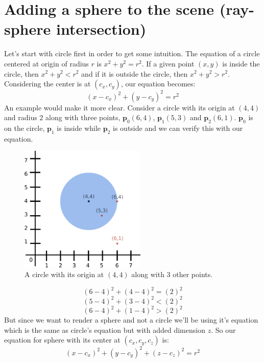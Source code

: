 \documentclass[11pt,a4paper]{article}
\begin{document}
	\section{Adding a sphere to the scene (ray-sphere intersection)}
	Let's start with circle first in order to get some intuition. The equation of a circle centered at origin of radius $r$ is $x^2+y^2=r^2$. If a given point $(x, y)$ is inside the circle, then $x^2+y^2<r^2$ and if it is outside the circle, then $x^2+y^2>r^2$. Considering the center is at $(c_{x}, c_{y})$, our equation becomes:
	\begin{equation}
	(x-c_{x})^2+(y-c_{y})^2=r^2
	\end{equation}
	An example would make it more clear. Consider a circle with its origin at $(4, 4)$ and radius $2$ along with three points, $\boldsymbol{p}_{0}(6, 4)$, $\boldsymbol{p}_{1}(5, 3)$ and $\boldsymbol{p}_{2}(6, 1)$. $\boldsymbol{p}_{0}$ is on the circle, $\boldsymbol{p}_{1}$ is inside while $\boldsymbol{p}_{2}$ is outside and we can verify this with our equation.
	\begin{figure}[H]
		\centering
		\includegraphics[width=6cm]{circle.png}
		\caption{\centering A circle with its origin at $(4, 4)$ along with 3 other points.}
	\end{figure}
	\noindent
	\begin{equation}
		(6-4)^2+(4-4)^2=(2)^2
	\end{equation}
	\begin{equation}
		(5-4)^2+(3-4)^2<(2)^2
	\end{equation}
	\begin{equation}
		(6-4)^2+(1-4)^2>(2)^2
	\end{equation}
	But since we want to render a sphere and not a circle we'll be using it's equation which is the same as circle's equation but with added dimension $z$. So our equation for sphere with its center at $(c_{x}, c_{y}, c_{z})$ is:
	\begin{equation}
	(x-c_{x})^2+(y-c_{y})^2+(z-c_{z})^2=r^2
	\end{equation}
\end{document}
